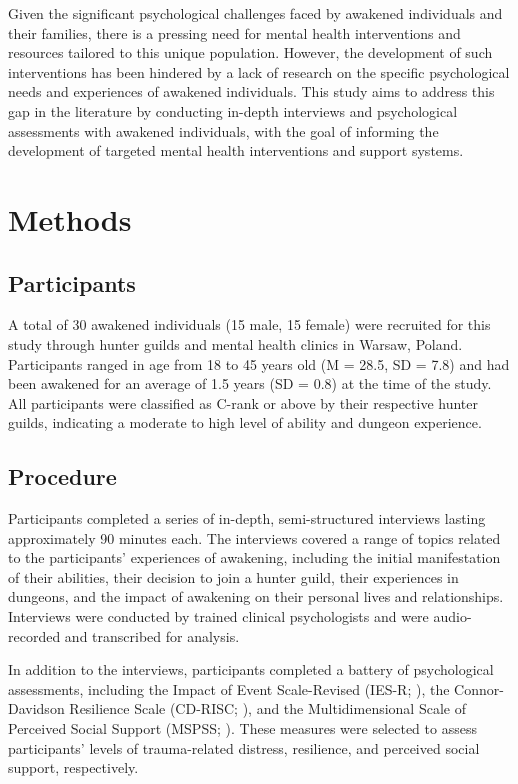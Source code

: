 \documentclass[12pt, a4paper]{article}
\begin{document}
Given the significant psychological challenges faced by awakened individuals and their families, there is a pressing need for mental health interventions and resources tailored to this unique population. However, the development of such interventions has been hindered by a lack of research on the specific psychological needs and experiences of awakened individuals. This study aims to address this gap in the literature by conducting in-depth interviews and psychological assessments with awakened individuals, with the goal of informing the development of targeted mental health interventions and support systems.

\section{Methods}
\subsection{Participants}
A total of 30 awakened individuals (15 male, 15 female) were recruited for this study through hunter guilds and mental health clinics in Warsaw, Poland. Participants ranged in age from 18 to 45 years old (M = 28.5, SD = 7.8) and had been awakened for an average of 1.5 years (SD = 0.8) at the time of the study. All participants were classified as C-rank or above by their respective hunter guilds, indicating a moderate to high level of ability and dungeon experience.

\subsection{Procedure}
Participants completed a series of in-depth, semi-structured interviews lasting approximately 90 minutes each. The interviews covered a range of topics related to the participants' experiences of awakening, including the initial manifestation of their abilities, their decision to join a hunter guild, their experiences in dungeons, and the impact of awakening on their personal lives and relationships. Interviews were conducted by trained clinical psychologists and were audio-recorded and transcribed for analysis.

In addition to the interviews, participants completed a battery of psychological assessments, including the Impact of Event Scale-Revised (IES-R; \citealt{Weiss2007}), the Connor-Davidson Resilience Scale (CD-RISC; \citealt{Connor2003}), and the Multidimensional Scale of Perceived Social Support (MSPSS; \citealt{Zimet1988}). These measures were selected to assess participants' levels of trauma-related distress, resilience, and perceived social support, respectively.
\end{document}
